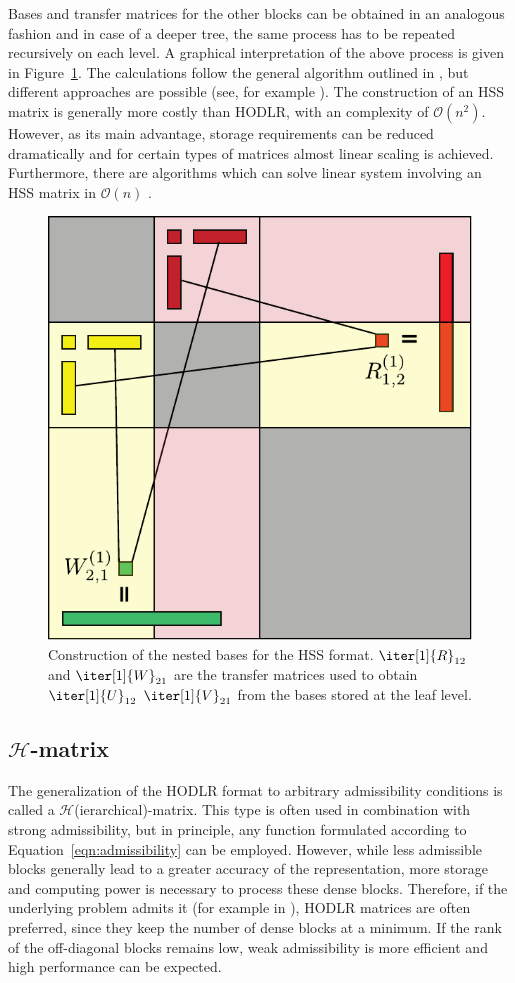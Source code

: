 \noindent Bases and transfer matrices for the other blocks can be obtained in an analogous fashion and in case of a deeper tree, the same process has to be repeated recursively on each level. A graphical interpretation of the above process is given in Figure~\hyperref[fig:nested_bases]{\ref{fig:nested_bases}}. The calculations follow the general algorithm outlined in \cite{xia_fast_2010}, but different approaches are possible (see, for example \cite{martinsson_fast_2011}). The construction of an HSS matrix is generally more costly than HODLR, with an complexity of $\mathcal{O}(n^2)$. However, as its main advantage, storage requirements can be reduced dramatically and for certain types of matrices almost linear scaling is achieved. Furthermore, there are algorithms which can solve linear system involving an HSS matrix in $\mathcal{O}(n)$ \cite{chandrasekaran_fast_2006}.

\begin{figure}[h]
    \centering
    \includegraphics[width=0.6\linewidth]{chapters/4_hierarchical_matrices/figures/nested_basis.pdf}
    \caption[Nested Bases Construction]{Construction of the nested bases for the HSS format. $\iter[1]{R}_{12}$ and $\iter[1]{W}_{21}$ are the transfer matrices used to obtain $\iter[1]{U}_{12}$ $\iter[1]{V}_{21}$ from the bases stored at the leaf level.}
    \label{fig:nested_bases}
\end{figure}

\subsection{\texorpdfstring{$\mathcal{H}$}{H}-matrix}
\label{sec:h_matrix}
The generalization of the HODLR format to arbitrary admissibility conditions is called a $\mathcal{H}$(ierarchical)-matrix. This type is often used in combination with strong admissibility, but in principle, any function formulated according to Equation~\hyperref[eqn:admissibility]{\ref{eqn:admissibility}} can be employed. However, while less admissible blocks generally lead to a greater accuracy of the representation, more storage and computing power is necessary to process these dense blocks. Therefore, if the underlying problem admits it (for example in \cite{ambikasaran_fast_2016}), HODLR matrices are often preferred, since they keep the number of dense blocks at a minimum. If the rank of the off-diagonal blocks remains low, weak admissibility is more efficient and high performance can be expected.


